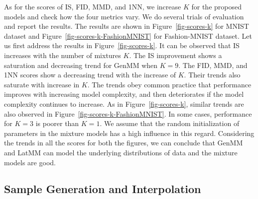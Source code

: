 As for the scores of IS, FID, MMD, and 1NN, we increase $K$ for the proposed models and check
how the four metrics vary. We do several trials of evaluation and
report the results. The results are shown in
Figure~\ref{fig-scores-k} for MNIST dataset and
Figure~\ref{fig-scores-k-FashionMNIST} for Fashion-MNIST dataset. Let us
first address the results in Figure~\ref{fig-scores-k}. It can be
observed that IS increases with the number of mixtures $K$. The IS
improvement shows a saturation and decreasing trend for GenMM when
$K=9$. The FID, MMD, and 1NN scores show a decreasing trend with the
increase of $K$. Their trends also saturate with increase in $K$. The
trends obey common practice that performance improves with
increasing model complexity, and then deteriorates if the model
complexity continues to increase. As in Figure~\ref{fig-scores-k}, similar trends are also observed in Figure~\ref{fig-scores-k-FashionMNIST}. In some cases, performance for $K=3$ is poorer than $K=1$. We assume that the random initialization of parameters in the mixture models has a high influence in this regard. 
Considering the trends in all the scores for both the figures, we can conclude that GenMM and LatMM can model the underlying distributions of data and the mixture models are good.

\subsection{Sample Generation and Interpolation}


